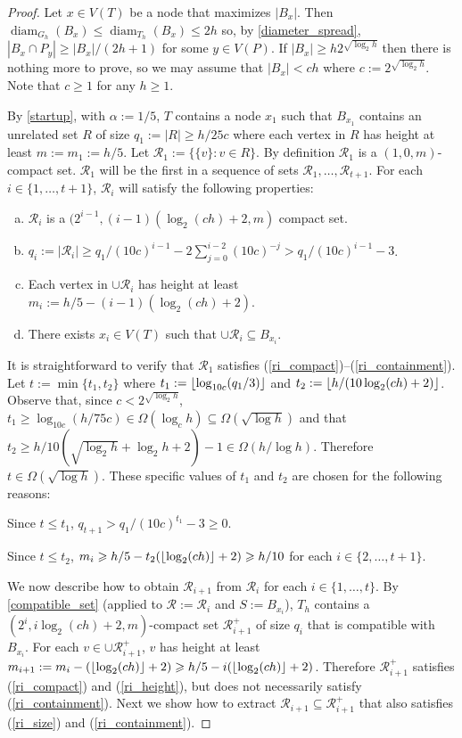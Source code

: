 \documentclass{patmorin}
\DeclareMathOperator{\diam}{diam}
\renewcommand{\le}{\leqslant}
\renewcommand{\ge}{\geqslant}
\begin{document}
\begin{proof}
  Let $x\in V(T)$ be a node that maximizes $|B_x|$.  Then $\diam_{G_h}(B_x)\le\diam_{T_h}(B_x) \le 2h$ so, by \cref{diameter_spread}, $|B_x\cap P_y|\ge |B_x|/(2h+1)$ for some $y\in V(P)$.  If $|B_x|\ge h2^{\sqrt{\log_2 h}}$ then there is nothing more to prove, so we may assume that $|B_x| < ch$ where $c:= 2^{\sqrt{\log_2 h}}$.  Note that $c\ge 1$ for any $h\ge 1$.

  By \cref{startup}, with $\alpha:= 1/5$, $T$ contains a node $x_1$ such that $B_{x_1}$ contains an unrelated set $R$ of size $q_1:=|R|\ge h/25c$ where each vertex in $R$ has height at least $m:=m_1:=h/5$.  Let  $\mathcal{R}_1:=\{\{v\}:v\in R\}$.  By definition $\mathcal{R}_1$ is a $(1,0,m)$-compact set.  $\mathcal{R}_1$ will be the first in a sequence of sets $\mathcal{R}_1,\ldots,\mathcal{R}_{t+1}$. For each $i\in\{1,\ldots,t+1\}$, $\mathcal{R}_i$ will satisfy the following properties:
  \begin{enumerate}[(a)]
     \item $\mathcal{R}_i$ is a $(2^{i-1},(i-1)(\log_2(ch)+2,m)$ compact set. \label{ri_compact}
     \item $q_i:=|\mathcal{R}_i| \ge q_1/(10c)^{i-1} - 2\sum_{j=0}^{i-2}(10c)^{-j} > q_1/(10c)^{i-1} - 3$. \label{ri_size}
     \item Each vertex in $\cup\mathcal{R}_i$ has height at least $m_i:=h/5-(i-1)(\log_2(ch)+2)$. \label{ri_height}
     \item There exists $x_i\in V(T)$ such that $\cup\mathcal{R}_i\subseteq B_{x_i}$. \label{ri_containment}
  \end{enumerate}
  It is straightforward to verify that $\mathcal{R}_1$ satisfies (\ref{ri_compact})--(\ref{ri_containment}).
  Let $t:= \min\{t_1,t_2\}$ where $t_1:={\lfloor \log_{10c}(q_1/3) \rfloor}$ and $t_2:={\lfloor h/(10\log_2(ch)+2) \rfloor}$. Observe that, since $c<2^{\sqrt{\log_2 h}}$,  $t_1\ge \log_{10c}(h/75c)\in\Omega(\log_c h)\subseteq \Omega(\sqrt{\log h})$ and that $t_2\ge h/10(\sqrt{\log_2 h} + \log_2 h + 2)-1\in\Omega(h/\log h)$.  Therefore $t\in\Omega(\sqrt{\log h})$. These specific values of $t_1$ and $t_2$ are chosen for the following reasons:
  \begin{compactenum}[(i)]
    \item Since $t\le t_1$, $q_{t+1} > q_1/(10c)^{t_1} - 3  \ge 0$.
    \item Since $t\le t_2$, $m_i \ge h/5-t_2(\floor{\log_2(ch)}+2) \ge h/10$ for each $i\in\{2,\ldots,t+1\}$.
  \end{compactenum}
  We now describe how to obtain $\mathcal{R}_{i+1}$ from $\mathcal{R}_i$ for each $i\in\{1,\ldots,t\}$.  By \cref{compatible_set} (applied to $\mathcal{R}:=\mathcal{R}_i$ and $S:=B_{x_i}$), $T_h$ contains a $(2^i,i\log_2(ch)+2,m)$-compact set $\mathcal{R}_{i+1}^+$ of size $q_i$ that is compatible with $B_{x_i}$. For each $v\in\cup\mathcal{R}_{i+1}^+$, $v$ has height at least $m_{i+1}:=m_i-(\floor{\log_2(ch)}+2)\ge h/5-i(\floor{\log_2(ch)}+2)$.  Therefore $\mathcal{R}_{i+1}^+$ satisfies (\ref{ri_compact}) and (\ref{ri_height}), but does not necessarily satisfy (\ref{ri_containment}).  Next we show how to extract $\mathcal{R}_{i+1}\subseteq\mathcal{R}_{i+1}^+$ that also satisfies (\ref{ri_size}) and (\ref{ri_containment}).


\end{proof}
\end{document}
